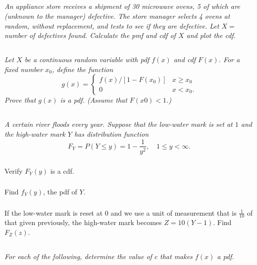 \documentclass[12pt]{amsart}
\begin{document}
\setcounter{subsection}{50}
\subsection{} %
\textit{An appliance store receives a shipment of 30 microwave ovens, 5 of which are (unknown
	to the manager) defective. The store manager selects 4 ovens at random, without
	replacement, and tests to see if they are defective. Let \(X =\) number of defectives
	found. Calculate the pmf and cdf of \(X\) and plot the cdf.}


\subsection{} %
\textit{Let \(X\) be a continuous random variable with pdf \(f(x)\) and cdf \(F(x)\). For a fixed number \(x_0\), define the function
	\[g(x) = \begin{cases}
		f(x)/[1 − F(x_0)] & x\geq x_0 \\
		0 & x < x_0.
	\end{cases} \]
	Prove that \(g(x)\) is a pdf. (Assume that \(F(x0) < 1\).)}


\subsection{} %
\textit{A certain river floods every year. Suppose that the low-water mark is set at \(1\) and the
	high-water mark \(Y\) has distribution function}
	\[ F_Y = P(Y\leq y) = 1-\frac{1}{y^2}, \quad 1\leq y<\infty. \]
	\subsubsection{} Verify \(F_Y(y)\) is a cdf.
	
	\subsubsection{} Find \(f_Y(y)\), the pdf of \(Y\).
	
	\subsubsection{} If the low-water mark is reset at \(0\) and we use a unit of measurement that is $\frac{1}{10}$ of
		that given previously, the high-water mark becomes \(Z = 10(Y − 1)\). Find \(F_Z(z)\).
		


\subsection{} %
\textit{For each of the following, determine the value of $c$ that makes $f(x)$ a pdf.}
\end{document}
